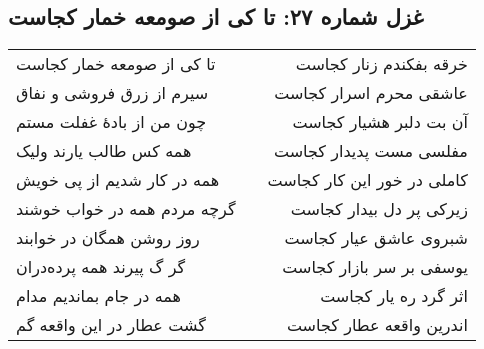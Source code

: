 \begin{center}
\section*{غزل شماره ۲۷: تا کی از صومعه خمار کجاست}
\label{sec:027}
\begin{longtable}{l p{0.5cm} r}
تا کی از صومعه خمار کجاست
&&
خرقه بفکندم زنار کجاست
\\
سیرم از زرق فروشی و نفاق
&&
عاشقی محرم اسرار کجاست
\\
چون من از بادهٔ غفلت مستم
&&
آن بت دلبر هشیار کجاست
\\
همه کس طالب یارند ولیک
&&
مفلسی مست پدیدار کجاست
\\
همه در کار شدیم از پی خویش
&&
کاملی در خور این کار کجاست
\\
گرچه مردم همه در خواب خوشند
&&
زیرکی پر دل بیدار کجاست
\\
روز روشن همگان در خوابند
&&
شبروی عاشق عیار کجاست
\\
گر گ پیرند همه پرده‌دران
&&
یوسفی بر سر بازار کجاست
\\
همه در جام بماندیم مدام
&&
اثر گرد ره یار کجاست
\\
گشت عطار در این واقعه گم
&&
اندرین واقعه عطار کجاست
\\
\end{longtable}
\end{center}
